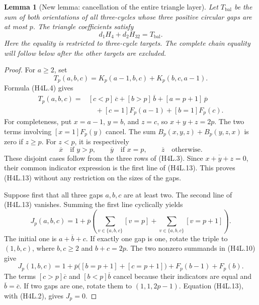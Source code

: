 \documentclass[11pt,oneside]{report}
\newtheorem{lemma}[theorem]{Lemma}
\theoremstyle{definition}
\numberwithin{equation}{section}
\begin{document}
\begin{lemma}[New lemma: cancellation of the entire triangle layer]
\label{J21:lem:h4-h32-triangle-cancellation}
Let $T_{\mathrm{bal}}$ be the sum of both orientations of all
three-cycles whose three positive circular gaps are at most $p$.
The triangle coefficients satisfy
\[
                   d_1H_4+d_2H_{32}=T_{\mathrm{bal}}.
 \tag{H4L.12}
\]
Here the equality is restricted to three-cycle targets. The complete
chain equality will follow below after the other targets are excluded.
\end{lemma}
\begin{proof}
For $a\geq2$, set
\[
 T_p(a,b,c)=K_p(a-1,b,c)+K_p(b,c,a-1).
\]
Formula (H4L.4) gives
\begin{align*}
 T_p(a,b,c)={}&[c<p]\,\overline c+[b>p]\,\overline b
       +[a=p+1]\,\overline p\\
     &\quad+[c=1]F_p(a-1)+[b=1]F_p(c).
 \tag{H4L.13}
\end{align*}
For completeness, put $x=a-1$, $y=b$, and $z=c$, so
$x+y+z=2p$.
The two terms involving $[x=1]F_p(y)$ cancel.
The sum $B_p(x,y,z)+B_p(y,z,x)$ is zero if $z\geq p$.
For $z<p$, it is respectively
\[
 \overline x\quad\text{if }y>p,\qquad
 \overline y\quad\text{if }x=p,\qquad
 \overline z\quad\text{otherwise}.
\]
These disjoint cases follow from the three rows of (H4L.3).
Since $\overline{x+y+z}=0$, their common indicator expression is
the first line of (H4L.13).
This proves (H4L.13) without any restriction on the sizes of the gaps.

Suppose first that all three gaps $a,b,c$ are at least two.
The second line of (H4L.13) vanishes.
Summing the first line cyclically yields
\[
 J_p(a,b,c)=1+
 \overline p\left(\sum_{v\in\{a,b,c\}}[v=p]
                    +\sum_{v\in\{a,b,c\}}[v=p+1]\right).
 \tag{H4L.14}
\]
The initial one is $\overline{a+b+c}$.
If exactly one gap is one, rotate the triple to $(1,b,c)$, where
$b,c\geq2$ and $b+c=2p$.
The two nonzero summands in (H4L.10) give
\[
 J_p(1,b,c)=1+\overline p\bigl([b=p+1]+[c=p+1]\bigr)
                 +F_p(b-1)+F_p(b).
 \tag{H4L.15}
\]
The terms $[c>p]\overline c$ and $[b<p]\overline b$ cancel
because their indicators are equal and $\overline b=\overline c$.
If two gaps are one, rotate them to $(1,1,2p-1)$.
Equation (H4L.13), with (H4L.2), gives $J_p=0$.


\end{proof}
\end{document}
